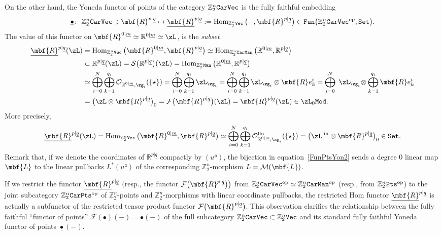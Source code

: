\documentclass[pdftex]{sigma}%
\newcommand{\op}[1]{\operatorname{#1}}
\newcommand{\R}{{\mathbb R}}
\newcommand{\Z}{{\mathbb Z}}
\def\ul{\underline}
\def\cM{\cal M}
\def\cO{\mathcal{O}}
\def\cF{\mathcal{F}}
\def\cM{\mathcal{M}}
\def\ul{\underline}
\newcommand{\0}{\otimes}
\newcommand{\z}{\Z_2^n}
\numberwithin{equation}{section}
\begin{document}
On the other hand, the Yoneda functor of points of the category $\z\tt CarVec$ is the fully faithful embedding
\[
\ul\bullet\colon\ \z{\tt CarVec}\ni\mbf{R}^{p|\ul q}\mapsto \ul{\mbf{R}}^{p|\ul q}:=\op{Hom}_{\z\tt Vec}\big({-},\mbf{R}^{p|\ul q}\big)\in{\tt Fun}\big(\z{\tt CarVec}^{\op{op}},\tt Set\big).
\]
The value of this functor on $\mbf{R}^{0|\ul m}\simeq\R^{0|\ul m}\simeq\zL$, is the {\it subset}
\begin{align}
\ul{\mbf{R}}^{p|\ul q}(\zL)&=\op{Hom}_{\z\tt Vec}\big(\mbf{R}^{0|\ul m},\mbf{R}^{p|\ul q}\big)\simeq\op{Hom}_{\z\tt CarMan}\big(\R^{0|\ul m},\R^{p|\ul q}\big)\nonumber
\\
&\subset\R^{p|\ul q}(\zL)=\mathcal{S}\big(\R^{p|\ul q}\big)(\zL)
=\op{Hom}_{\z\tt Man}\big(\R^{0|\ul m},\R^{p|\ul q}\big) \nonumber \\
&\simeq\bigoplus_{i=0}^{N}\bigoplus_{k=1}^{q_i}\cO_{\R^{0|\ul m},\zg_i}(\{\star\})=\bigoplus_{i=0}^{N}\bigoplus_{k=1}^{q_i}\zL_{\zg_i} =\bigoplus_{i=0}^{N}\bigoplus_{k=1}^{q_i}\zL_{\zg_i}\0\mbf{R} e^i_k =\bigoplus_{i=0}^{N}\;\zL_{\zg_i}\!\0\bigoplus_{k=1}^{q_i}\mbf{R} e^i_k\nonumber
\\
&=
\big(\zL\0\mbf{R}^{p|\ul q}\big)_0=\cF\big(\mbf{R}^{p|\ul q}\big)(\zL)=\mbf{R}^{p|\ul q}(\zL)\in\zL_0\tt Mod.
\label{FunPtsYon1}
\end{align}
More precisely,
\begin{gather}\label{FunPtsYon2}
\ul{\mbf{R}}^{p|\ul q}(\zL)=\op{Hom}_{\z\tt Vec}\big(\mbf{R}^{0|\ul m},\mbf{R}^{p|\ul q}\big)\simeq \bigoplus_{i=0}^{N}\bigoplus_{k=1}^{q_i}\cO^{\op{lin}}_{\R^{0|\ul m},\zg_i}(\{\star\})=\big(\zL^{\op{lin}}\0\mbf{R}^{p|\ul q}\big)_0\in\tt Set.
\end{gather}
Remark that, if we denote the coordinates of $\R^{p|\ul q}$ compactly by $(u^{\mathfrak a})$, the bijection in equation~\eqref{FunPtsYon2} sends a degree 0 linear map $\mbf{L}$ to the linear pullbacks $L^*(u^{\mathfrak a})$ of the corresponding $\z$-morphism $L=\cM(\mbf{L})$.

\begin{Remark}
If we restrict the functor $\ul{\mbf{R}}^{p|\ul q}$ $\big($resp., the functor $\cF\big(\mbf{R}^{p|\ul q}\big)\big)$ from $\z{\tt CarVec}^{\op{op}}\simeq\z{\tt CarMan}^{\op{op}}$ (resp., from $\z\tt Pts^{\op{op}}$) to the joint subcategory $\z\tt Car Pts^{\op{op}}$ of $\z$-points and $\z$-morphisms with linear coordinate pullbacks, the restricted Hom functor $\ul{\mbf{R}}^{p|\ul q}$ is actually a subfunctor of the restricted tensor product functor $\cF\big(\mbf{R}^{p|\ul q}\big)$. This observation clarifies the relationship between the fully faithful ``functor of points'' $\cF(\bullet)(-)=\bullet(-)$ of the full subcategory $\z{\tt CarVec}\subset\z\tt Vec$ and its standard fully faithful Yoneda functor of points $\ul\bullet(-)$.
\end{Remark}
\end{document}
